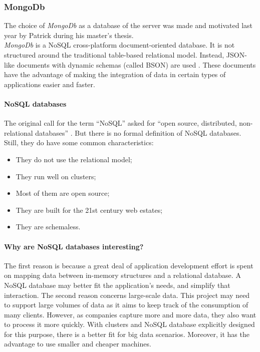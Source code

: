 \documentclass[a4paper, oneside, 11pt]{book}
\begin{document}
\subsubsection{MongoDb}
The choice of \textit{MongoDb} as a database of the server was made and motivated last year by Patrick during his master’s thesis.\\

\textit{MongoDb} is a NoSQL cross-platform document-oriented database. It is not structured around the traditional table-based relational model. Instead, JSON-like documents with dynamic schemas (called BSON) are used \cite{Mongo:online}. These documents have the advantage of making the integration of data in certain types of applications easier and faster. 

\paragraph{NoSQL databases}
The original call for the term “NoSQL” asked for “open source, distributed, non-relational databases” \cite{nosql:book}. But there is no formal definition of NoSQL databases. Still, they do have some common characteristics:
\begin{itemize}
	\item They do not use the relational model;
	\item They run well on clusters;
	\item Most of them are open source;
	\item They are built for the 21st century web estates;
	\item They are schemaless.
\end{itemize}

\paragraph{Why are NoSQL databases interesting?}
The first reason is because a great deal of application development effort is spent on mapping data between in-memory structures and a relational database. A NoSQL database may better fit the application’s needs, and simplify that interaction. The second reason concerns large-scale data. This project may need to support large volumes of data as it aims to keep track of the consumption of many clients. However, as companies capture more and more data, they also want to process it more quickly. With clusters and NoSQL database explicitly designed for this purpose, there is a better fit for big data scenarios. Moreover, it has the advantage to use smaller and cheaper machines.
\end{document}
